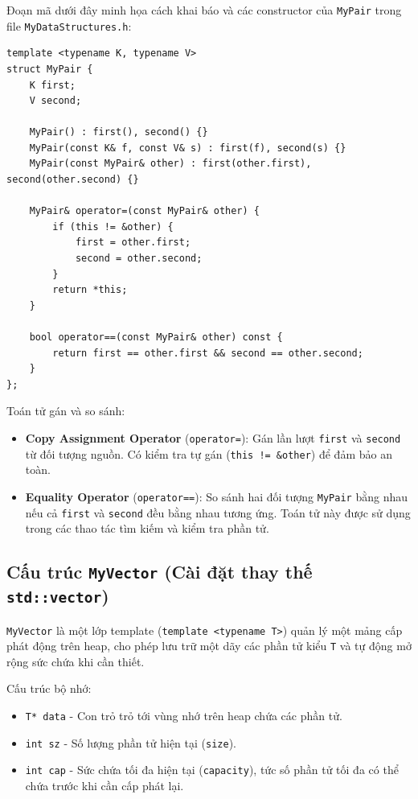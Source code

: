 \documentclass{report}
\begin{document}
Đoạn mã dưới đây minh họa cách khai báo và các constructor của \texttt{MyPair} trong file \texttt{MyDataStructures.h}:

\begin{lstlisting}[caption={Cấu trúc MyPair (File MyDataStructures.h)}, label={lst:mypair}]
template <typename K, typename V>
struct MyPair {
    K first;
    V second;

    MyPair() : first(), second() {}
    MyPair(const K& f, const V& s) : first(f), second(s) {}
    MyPair(const MyPair& other) : first(other.first), second(other.second) {}

    MyPair& operator=(const MyPair& other) {
        if (this != &other) {
            first = other.first;
            second = other.second;
        }
        return *this;
    }

    bool operator==(const MyPair& other) const {
        return first == other.first && second == other.second;
    }
};
\end{lstlisting}

Toán tử gán và so sánh:
\begin{itemize}
    \item \textbf{Copy Assignment Operator} (\texttt{operator=}): Gán lần lượt \texttt{first} và \texttt{second} từ đối tượng nguồn. Có kiểm tra tự gán (\texttt{this != \&other}) để đảm bảo an toàn.
    \item \textbf{Equality Operator} (\texttt{operator==}): So sánh hai đối tượng \texttt{MyPair} bằng nhau nếu cả \texttt{first} và \texttt{second} đều bằng nhau tương ứng. Toán tử này được sử dụng trong các thao tác tìm kiếm và kiểm tra phần tử.
\end{itemize}

\subsection{Cấu trúc \texttt{MyVector} (Cài đặt thay thế \texttt{std::vector})}

\texttt{MyVector} là một lớp template (\texttt{template <typename T>}) quản lý một mảng cấp phát động trên heap, cho phép lưu trữ một dãy các phần tử kiểu \texttt{T} và tự động mở rộng sức chứa khi cần thiết.

Cấu trúc bộ nhớ:
\begin{itemize}
    \item \texttt{T* data} - Con trỏ trỏ tới vùng nhớ trên heap chứa các phần tử.
    \item \texttt{int sz} - Số lượng phần tử hiện tại (\texttt{size}).
    \item \texttt{int cap} - Sức chứa tối đa hiện tại (\texttt{capacity}), tức số phần tử tối đa có thể chứa trước khi cần cấp phát lại.
\end{itemize}
\end{document}

